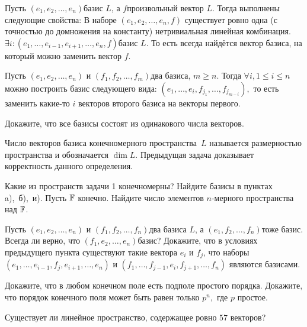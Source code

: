 \documentclass[a4paper,12pt,fleqn]{article}
\begin{document}
Пусть $(e_1, e_2, \ldots, e_n)$\т базис $L$, а $f$\т произвольный вектор $L$. Тогда выполнены следующие свойства:
В наборе $(e_1, e_2, \ldots, e_n, f)$ существует ровно одна (с точностью до домножения на константу) нетривиальная линейная комбинация.
$\exists i: (e_1, \ldots, e_{i-1}, e_{i+1}, \ldots, e_n, f)$\т базис $L$. То есть всегда найдётся вектор базиса, на который можно заменить вектор $f$.

Пусть $(e_1, e_2, \ldots, e_n)$ и $(f_1, f_2, \ldots, f_m)$\т два базиса, $m\ge n$. Тогда $\forall i, 1\le i\le n$ можно построить базис следующего вида: $(e_1, \ldots, e_i, f_{j_1}, \ldots, f_{j_{m-i}}),$ то есть заменить какие-то $i$ векторов второго базиса на векторы первого.

Докажите, что все базисы состоят из одинакового числа векторов.

Число векторов базиса конечномерного пространства~$L$ называется  размерностью пространства и обозначается $\dim L$. Предыдущая задача доказывает корректность данного определения.

Какие из пространств задачи 1 конечномерны? Найдите базисы в пунктах a),~б),~и).
Пусть $\mathbb{F}$ конечно. Найдите число элементов $n$-мерного пространства над $\mathbb{F}$.

Пусть $(e_1, e_2, \ldots, e_n)$ и $(f_1, f_2, \ldots, f_n)$\т два базиса $L$, а $(e_1, f_2, \ldots, f_n)$\т тоже базис. Всегда ли верно, что $(f_1, e_2, \ldots, e_n)$\т базис?
Докажите, что в условиях предыдущего пункта существуют такие вектора $e_i$ и $f_j$, что наборы $(e_1, \ldots, e_{i-1}, f_j, e_{i+1}, \ldots, e_n)$ и $(f_1, \ldots, f_{j-1}, e_i, f_{j+1}, \ldots, f_n)$ являются базисами.

Докажите, что в любом конечном поле есть подполе простого порядка.
Докажите, что порядок конечного поля может быть равен только $p^n,$ где $p$ простое.

Существует ли линейное пространство, содержащее ровно $57$ векторов?

{}
\end{document}
